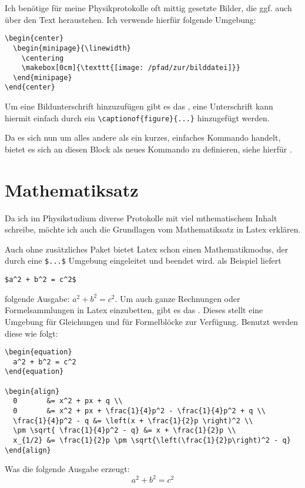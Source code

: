 Ich benötige für meine Physikprotokolle oft mittig gesetzte Bilder, die ggf. auch über den Text heraustehen.
Ich verwende hierfür folgende Umgebung:
\begin{verbatim}
\begin{center}
  \begin{minipage}{\linewidth}
    \centering
    \makebox[0cm]{\texttt{[image: /pfad/zur/bilddatei]}}
  \end{minipage}
\end{center}
\end{verbatim}

Um eine Bildunterschrift hinzuzufügen gibt es das , eine Unterschrift kann hiermit einfach
durch ein \verb+\captionof{figure}{...}+ hinzugefügt werden.

Da es sich nun um alles andere als ein kurzes, einfaches Kommando handelt, bietet es sich an diesen Block als neues
Kommando zu definieren, siehe hierfür .

\section{Mathematiksatz}
Da ich im Physikstudium diverse Protokolle mit viel mthematischem Inhalt schreibe, möchte ich auch die
Grundlagen vom Mathematiksatz in Latex erklären.

Auch ohne zusätzliches Paket bietet Latex schon einen Mathematikmodus, der durch eine \verb+$...$+
Umgebung eingeleitet und beendet wird. als Beispiel liefert
\begin{verbatim}
$a^2 + b^2 = c^2$
\end{verbatim}
folgende Ausgabe:
$a^2 + b^2 = c^2$. Um auch ganze Rechnungen oder Formelsammlungen in Latex einzubetten, gibt es das
. Dieses stellt eine Umgebung für Gleichungen und für Formelblöcke zur Verfügung.
Benutzt werden diese wie folgt:
\begin{verbatim}
\begin{equation}
  a^2 + b^2 = c^2
\end{equation}

\begin{align}
  0       &= x^2 + px + q \\
  0       &= x^2 + px + \frac{1}{4}p^2 - \frac{1}{4}p^2 + q \\
  \frac{1}{4}p^2 - q &= \left(x + \frac{1}{2}p \right)^2 \\
  \pm \sqrt{ \frac{1}{4}p^2 - q} &= x + \frac{1}{2}p \\
  x_{1/2} &= \frac{1}{2}p \pm \sqrt{\left(\frac{1}{2}p\right)^2 - q}  
\end{align}
\end{verbatim}
Was die folgende Ausgabe erzeugt:
\begin{equation}
  a^2 + b^2 = c^2
\end{equation}

